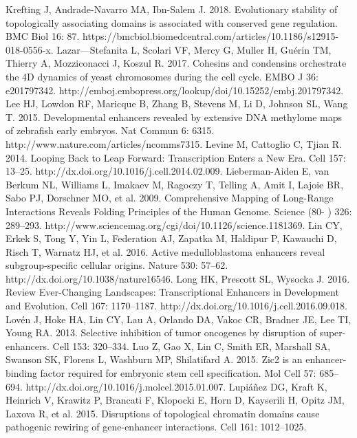\begin{thebibliography}{1}
	 Krefting J, Andrade-Navarro MA, Ibn-Salem J. 2018. Evolutionary stability of topologically associating domains is associated with conserved gene regulation. BMC Biol 16: 87. https://bmcbiol.biomedcentral.com/articles/10.1186/s12915-018-0556-x.
	 Lazar---Stefanita L, Scolari VF, Mercy G, Muller H, Guérin TM, Thierry A, Mozziconacci J, Koszul R. 2017. Cohesins and condensins orchestrate the 4D dynamics of yeast chromosomes during the cell cycle. EMBO J 36: e201797342. http://emboj.embopress.org/lookup/doi/10.15252/embj.201797342.
	 Lee HJ, Lowdon RF, Maricque B, Zhang B, Stevens M, Li D, Johnson SL, Wang T. 2015. Developmental enhancers revealed by extensive DNA methylome maps of zebrafish early embryos. Nat Commun 6: 6315. http://www.nature.com/articles/ncomms7315.
	 Levine M, Cattoglio C, Tjian R. 2014. Looping Back to Leap Forward: Transcription Enters a New Era. Cell 157: 13–25. http://dx.doi.org/10.1016/j.cell.2014.02.009.
	 Lieberman-Aiden E, van Berkum NL, Williams L, Imakaev M, Ragoczy T, Telling A, Amit I, Lajoie BR, Sabo PJ, Dorschner MO, et al. 2009. Comprehensive Mapping of Long-Range Interactions Reveals Folding Principles of the Human Genome. Science (80- ) 326: 289–293. http://www.sciencemag.org/cgi/doi/10.1126/science.1181369.
	 Lin CY, Erkek S, Tong Y, Yin L, Federation AJ, Zapatka M, Haldipur P, Kawauchi D, Risch T, Warnatz HJ, et al. 2016. Active medulloblastoma enhancers reveal subgroup-specific cellular origins. Nature 530: 57–62. http://dx.doi.org/10.1038/nature16546.
	 Long HK, Prescott SL, Wysocka J. 2016. Review Ever-Changing Landscapes: Transcriptional Enhancers in Development and Evolution. Cell 167: 1170–1187. http://dx.doi.org/10.1016/j.cell.2016.09.018.
	 Lovén J, Hoke HA, Lin CY, Lau A, Orlando DA, Vakoc CR, Bradner JE, Lee TI, Young RA. 2013. Selective inhibition of tumor oncogenes by disruption of super-enhancers. Cell 153: 320–334.
	 Luo Z, Gao X, Lin C, Smith ER, Marshall SA, Swanson SK, Florens L, Washburn MP, Shilatifard A. 2015. Zic2 is an enhancer-binding factor required for embryonic stem cell specification. Mol Cell 57: 685–694. http://dx.doi.org/10.1016/j.molcel.2015.01.007.
	 Lupiáñez DG, Kraft K, Heinrich V, Krawitz P, Brancati F, Klopocki E, Horn D, Kayserili H, Opitz JM, Laxova R, et al. 2015. Disruptions of topological chromatin domains cause pathogenic rewiring of gene-enhancer interactions. Cell 161: 1012–1025.

\end{thebibliography}
